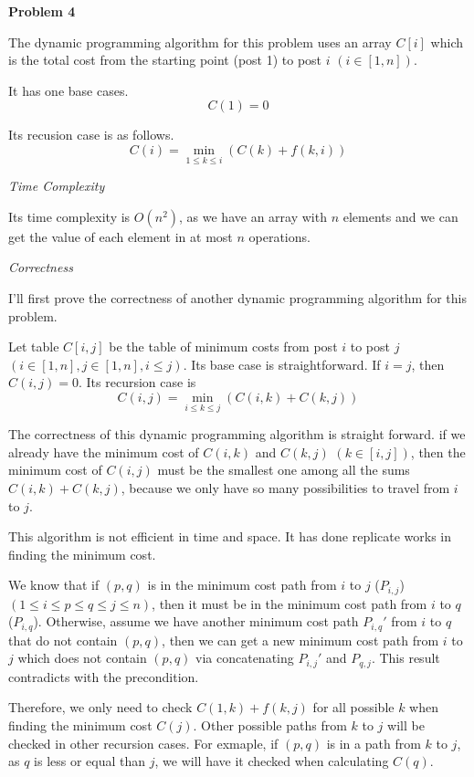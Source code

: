 \documentclass[12pt,letterpaper]{article}
\def\pp{\par\noindent}
\newcommand{\problem}[1]{ \bigskip \pp \textbf{Problem #1}\par}
\begin{document}
\problem{4}
The dynamic programming algorithm for this problem uses an array $C[i]$ which is the total cost from the starting point (post 1) to post $i$ $(i\in[1,n])$.\par
It has one base cases.
\[
	C(1)=0
\]\par
Its recusion case is as follows.
\[
	C(i)=\underset{1\leq k\leq i}{\min}(C(k)+f(k,i))
\]\par
\medskip\noindent\textit{Time Complexity}\par
Its time complexity is $O(n^2)$, as we have an array with $n$ elements and we can get the value of each element in at most $n$ operations.\par
\medskip\noindent\textit{Correctness}\par
I'll first prove the correctness of another dynamic programming algorithm for this problem.\par
Let table $C[i, j]$ be the table of minimum costs from post $i$ to post $j$ $(i\in[1,n], j\in[1,n], i\leq j)$. Its base case is straightforward. If $i=j$, then $C(i, j)=0$. Its recursion case is
\[
	C(i,j)=\underset{i\leq k\leq j}{\min}(C(i,k)+C(k,j))
\]\par
The correctness of this dynamic programming algorithm is straight forward. if we already have the minimum cost of $C(i,k)$ and $C(k,j)$ $(k\in[i,j])$, then the minimum cost of $C(i,j)$ must be the smallest one among all the sums $C(i,k)+C(k,j)$, because we only have so many possibilities to travel from $i$ to $j$.\par
This algorithm is not efficient in time and space. It has done replicate works in finding the minimum cost.\par
We know that if $(p, q)$ is in the minimum cost path from $i$ to $j$ ($P_{i,j}$) $(1\leq i\leq p\leq q \leq j\leq n)$, then it must be in the minimum cost path from $i$ to $q$ ($P_{i,q}$). Otherwise, assume we have another minimum cost path $P_{i,q}'$ from $i$ to $q$ that do not contain $(p,q)$, then we can get a new minimum cost path from $i$ to $j$ which does not contain $(p,q)$ via concatenating $P_{i,j}'$ and $P_{q,j}$. This result contradicts with the precondition.\par
Therefore, we only need to check $C(1,k)+f(k,j)$ for all possible $k$ when finding the minimum cost $C(j)$. Other possible paths from $k$ to $j$ will be checked in other recursion cases. For exmaple, if $(p,q)$ is in a path from $k$ to $j$, as $q$ is less or equal than $j$, we will have it checked when calculating $C(q)$.\par
\end{document}
